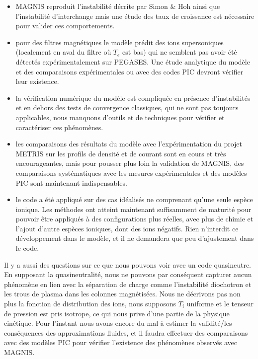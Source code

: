 \begin{itemize}

  
  \item MAGNIS reproduit l'instabilité décrite par Simon \& Hoh ainsi
  que l'instabilité d'interchange mais une étude des taux de croissance est
  nécessaire pour valider ces comportements.
  \item pour des filtres magnétiques le modèle prédit des ions supersoniques
  (localement en aval du filtre où $T_e$ est bas) qui ne semblent pas avoir été
  détectés expérimentalement sur PEGASES. Une étude analytique du modèle et des
  comparaisons expérimentales ou avec des codes PIC devront vérifier leur
  existence.
  \item la vérification numérique du modèle est compliquée en présence
  d'instabilités et en dehors des tests de convergence classiques, qui ne sont
  pas toujours applicables, nous manquons d'outils et de techniques pour
  vérifier et caractériser ces phénomènes.
    \item les comparaisons des résultats du modèle avec l'expérimentation du
  projet METRIS sur les profils de densité et
  de courant sont en cours et très encourageantes, mais pour pousser plus
  loin la validation de MAGNIS, des comparaisons systématiques avec les mesures
  expérimentales et des modèles PIC sont maintenant indispensables.
  \item le code a été appliqué sur des cas idéalisés ne comprenant qu'une seule
  espèce ionique. Les méthodes ont atteint maintenant suffisamment
  de maturité pour pouvoir être appliqués à des configurations plus réelles,
  avec plus de chimie et l'ajout d'autre espèces ioniques, dont des ions
  négatifs. Rien n'interdit ce développement dans le modèle, et il ne demandera
  que peu d'ajustement dans le code.

\end{itemize} 

Il y a aussi des questions sur ce que nous pouvons voir avec un code
quasineutre. En supposant la quasineutralité, nous ne pouvons par conséquent
capturer aucun phénomène en lien avec la séparation de charge comme
l'instabilité diochotron et les trous de plasma dans les colonnes magnétisées.
Nous ne décrivons pas non plus la fonction de distribution des ions, nous
supposons $T_i$ uniforme et le tenseur de pression est pris isotrope, ce qui
nous prive d'une partie de la physique cinétique.
Pour l'instant nous avons encore du mal à estimer la validité/les conséquences des
approximations fluides, et il faudra effectuer des comparaisons avec des
modèles PIC pour vérifier l'existence des phénomènes observés avec MAGNIS.




